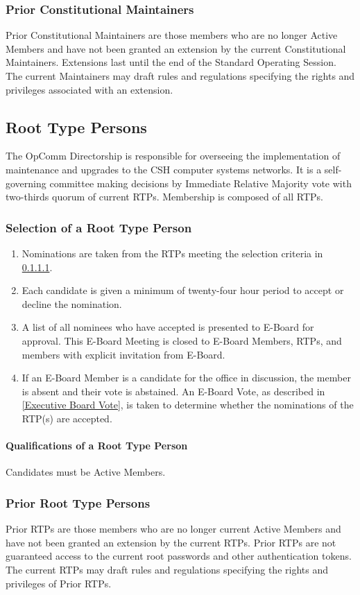 \documentclass{article}
\newcommand{\asection}[1]{\subsection{#1} \label{#1}}
\newcommand{\asubsection}[1]{\subsubsection{#1} \label{#1}}
\newcommand{\asubsubsection}[1]{\paragraph{#1} \label{#1}}
\begin{document}
\asubsection{Prior Constitutional Maintainers}
Prior Constitutional Maintainers are those members who are no longer Active Members and have not been granted an extension by the current Constitutional Maintainers.
Extensions last until the end of the Standard Operating Session. 
The current Maintainers may draft rules and regulations specifying the rights and privileges associated with an extension.

\asection{Root Type Persons}
The OpComm Directorship is responsible for overseeing the implementation of maintenance and upgrades to the CSH computer systems networks.
It is a self-governing committee making decisions by Immediate Relative Majority vote with two-thirds quorum of current RTPs.
Membership is composed of all RTPs.

\asubsection{Selection of a Root Type Person}
\renewcommand{\theenumi}{\alph{enumi}} %
\begin{enumerate}
	\item Nominations are taken from the RTPs meeting the selection criteria in \ref{Qualifications of a Root Type Person}.
	\item Each candidate is given a minimum of twenty-four hour period to accept or decline the nomination.
	\item A list of all nominees who have accepted is presented to E-Board for approval.
	      This E-Board Meeting is closed to E-Board Members, RTPs, and members with explicit invitation from E-Board.
	\item If an E-Board Member is a candidate for the office in discussion, the member is absent and their vote is abstained.
	      An E-Board Vote, as described in \ref{Executive Board Vote}, is taken to determine whether the nominations of the RTP(s) are accepted.
\end{enumerate}

\asubsubsection{Qualifications of a Root Type Person}
Candidates must be Active Members.

\asubsection{Prior Root Type Persons}
Prior RTPs are those members who are no longer current Active Members and have not been granted an extension by the current RTPs.
Prior RTPs are not guaranteed access to the current root passwords and other authentication tokens.
The current RTPs may draft rules and regulations specifying the rights and privileges of Prior RTPs.
\end{document}
